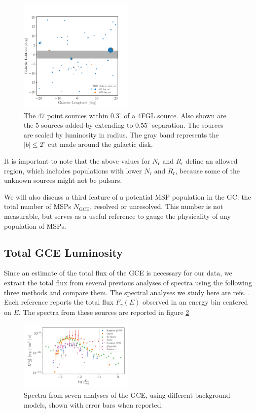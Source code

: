 \documentclass[a4paper,11pt]{article}
\newcommand{\comment}[1]{\emph{\color{red}{#1}}}
\begin{document}
\begin{figure}
    \centering
    \includegraphics[width=0.5\textwidth]{figs/point-source-positions.pdf}
    \caption{The 47 point sources within $0.3^\circ$ of a 4FGL source. Also shown are the 5 sourecs added by extending to $0.55^\circ$ separation. The sources are scaled by luminosity in radius. The gray band represents the $|b| \leq 2^\circ$ cut made around the galactic disk.}
    \label{fig:47-sources}
\end{figure}

It is important to note that the above values for $N_\text{r}$ and $R_\text{r}$ define an allowed region, which includes populations with lower $N_\text{r}$ and $R_\text{r}$, because some of the unknown sources might not be pulsars.



We will also discuss a third feature of a potential MSP population in the GC: the total number of MSPs $N_\text{GCE}$, resolved or unresolved. This number is not measurable, but serves as a useful reference to gauge the physicality of any population of MSPs. \comment{Mention that it's expected to be around 40,000.}


\subsection{Total GCE Luminosity}
\label{sec:total-lum}
Since an estimate of the total flux of the GCE is necessary for our data, we extract the total flux from several previous analyses of spectra using the following three methods and compare them. The spectral analyses we study here are refs. \cite{Zhong:2019ycb, Calore:2014xka, DiMauro:2021raz, Abazajian:2014fta, Gordon, Ajello}. Each reference reports the total flux $F_\gamma(E)$ observed in an energy bin centered on $E$. The spectra from these sources are reported in figure \ref{fig:all-spectra}
\begin{figure}
    \centering
    \includegraphics[width=0.5\textwidth]{figs/all-spectra.pdf}
    \caption{Spectra from seven analyses of the GCE, using different background models, shown with error bars when reported.}
    \label{fig:all-spectra}
\end{figure}
\end{document}
